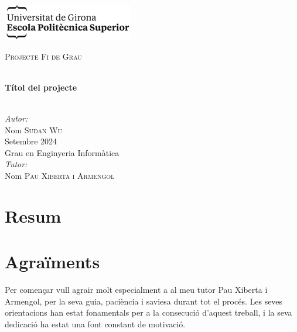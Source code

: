 \documentclass[a4paper,12pt,twoside]{ThesisStyle}
\begin{document}
\begin{titlepage}

\includegraphics[scale=0.9]{imatges/logo_eps.png} \\[1cm]
\begin{center}
\textsc{\Large Projecte Fi de Grau} \\[1cm]

\begin{spacing}{2}
\HRule \\
\textbf{\Huge Títol del projecte} \\
\HRule \\[0.5cm]
\end{spacing}

{
\large
\emph{Autor:} \\
Nom \textsc{Sudan Wu} \\[1cm]
Setembre 2024 \\[1cm]
Grau en Enginyeria Informàtica \\[1cm]
\emph{Tutor:} \\
Nom \textsc{Pau Xiberta i Armengol} \\
}

\end{center}
\end{titlepage}

\titlepage

\dominitoc


\chapter*{Resum}
\label{chp:resum}



\chapter*{Agraïments}
\label{chp:agraiments}

Per començar vull agrair molt especialment a al meu tutor Pau Xiberta i Armengol, per la seva guia, paciència i saviesa durant tot el procés. Les seves orientacions han estat fonamentals per a la consecució d’aquest treball, i la seva dedicació ha estat una font constant de motivació.\\
\end{document}
